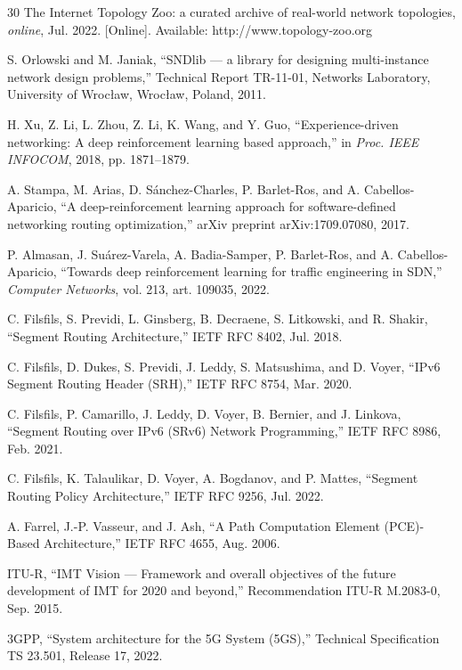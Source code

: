\documentclass[journal]{IEEEtran}
\begin{document}
\begin{thebibliography}{30}
 The Internet Topology Zoo: a curated archive of real-world
network topologies, \emph{online}, Jul. 2022. [Online]. Available:
http://www.topology-zoo.org

 S. Orlowski and M. Janiak, ``SNDlib --- a library for
designing multi-instance network design problems,'' Technical Report
TR-11-01, Networks Laboratory, University of Wroc\l aw, Wroc\l aw, Poland,
2011.

 H. Xu, Z. Li, L. Zhou, Z. Li, K. Wang, and Y.
Guo, ``Experience-driven networking: A deep reinforcement learning based
approach,'' in \emph{Proc. IEEE INFOCOM}, 2018, pp. 1871--1879.

 A. Stampa, M. Arias, D. S\'anchez-Charles, P.
Barlet-Ros, and A. Cabellos-Aparicio, ``A deep-reinforcement learning
approach for software-defined networking routing optimization,'' arXiv
preprint arXiv:1709.07080, 2017.

 P. Almasan, J. Su\'arez-Varela, A. Badia-Samper, P.
Barlet-Ros, and A. Cabellos-Aparicio, ``Towards deep reinforcement learning
for traffic engineering in SDN,'' \emph{Computer Networks}, vol. 213, art.
109035, 2022.

 C. Filsfils, S. Previdi, L. Ginsberg, B. Decraene, S.
Litkowski, and R. Shakir, ``Segment Routing Architecture,'' IETF RFC 8402,
Jul. 2018.

 C. Filsfils, D. Dukes, S. Previdi, J. Leddy, S.
Matsushima, and D. Voyer, ``IPv6 Segment Routing Header (SRH),'' IETF RFC
8754, Mar. 2020.

 C. Filsfils, P. Camarillo, J. Leddy, D. Voyer, B.
Bernier, and J. Linkova, ``Segment Routing over IPv6 (SRv6) Network
Programming,'' IETF RFC 8986, Feb. 2021.

 C. Filsfils, K. Talaulikar, D. Voyer, A. Bogdanov, and P.
Mattes, ``Segment Routing Policy Architecture,'' IETF RFC 9256, Jul. 2022.

 A. Farrel, J.-P. Vasseur, and J. Ash, ``A Path Computation
Element (PCE)-Based Architecture,'' IETF RFC 4655, Aug. 2006.

 ITU-R, ``IMT Vision --- Framework and overall objectives
of the future development of IMT for 2020 and beyond,'' Recommendation
ITU-R M.2083-0, Sep. 2015.

 3GPP, ``System architecture for the 5G System
(5GS),'' Technical Specification TS 23.501, Release 17, 2022.


\end{thebibliography}
\end{document}
